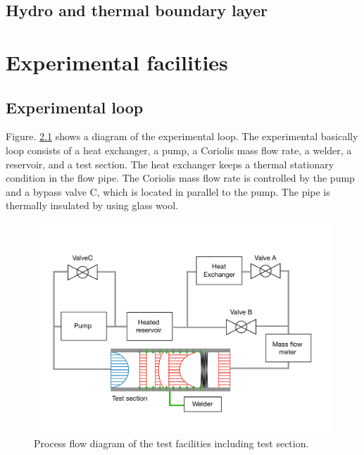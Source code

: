 \documentclass[12pt,oneside]{jbook}
\begin{document}
\clearpage
\section{Hydro and thermal boundary layer}

\chapter{Experimental facilities}
\section{Experimental loop}
Figure. \ref{loop} shows a diagram of the experimental loop.
The experimental basically loop consists of a heat exchanger, a pump, a Coriolis mass flow rate, a welder, a reservoir, and a test section.
The heat exchanger keeps a thermal stationary condition in the flow pipe.
The Coriolis mass flow rate is controlled by the pump and a bypass valve C, which is located in parallel to the pump.
The pipe is thermally insulated by using glass wool.\\

\begin{figure}[ht]
	\vspace{0zh}
	\begin{center}
		\includegraphics[width=1\linewidth]{fig/loop.pdf}
		\vspace{-3zh}
		\caption{Process flow diagram of the test facilities including test section.}
		\label{loop}
	\end{center}
	\vspace{0zh}
\end{figure}
\end{document}
